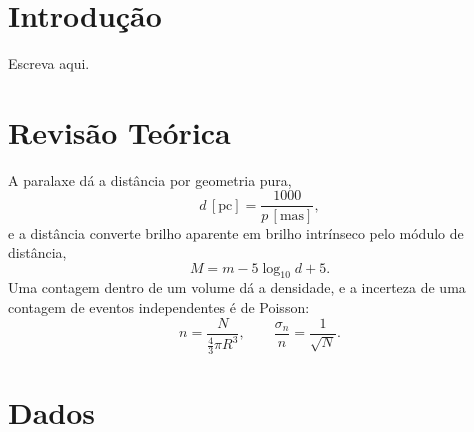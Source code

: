 \documentclass[10pt,a4paper,twocolumn]{article}
\begin{document}
\section{Introdução}

Escreva aqui.

\section{Revisão Teórica}

A paralaxe dá a distância por geometria pura,
\begin{equation}
d\,[\mathrm{pc}] = \frac{1000}{p\,[\mathrm{mas}]} ,
\label{eq:dist}
\end{equation}
e a distância converte brilho aparente em brilho intrínseco pelo módulo de
distância,
\begin{equation}
M = m - 5\log_{10} d + 5 .
\label{eq:modulo}
\end{equation}
Uma contagem dentro de um volume dá a densidade, e a incerteza de uma contagem
de eventos independentes é de Poisson:
\begin{equation}
n = \frac{N}{\tfrac{4}{3}\pi R^{3}} ,
\qquad
\frac{\sigma_n}{n} = \frac{1}{\sqrt{N}} .
\label{eq:dens}
\end{equation}

\section{Dados}
\end{document}
